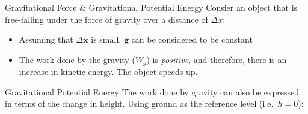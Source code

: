 \documentclass[12pt,compress,aspectratio=169]{beamer}
\begin{document}
\begin{frame}{Gravitational Force \& Gravitational Potential Energy}
  Consier an object that is free-falling under the force of gravity over a
  distance of $\Delta x$:

  \begin{center}
  \end{center}
  \begin{itemize}
  \item Assuming that $\Delta\bm x$ is small, $\bm g$ can be considered to be
    constant
  \item The work done by the gravity ($W_g$) is \emph{positive}, and
    therefore, there is an increase in kinetic energy. The object speeds up.

  \end{itemize}
\end{frame}



\begin{frame}{Gravitational Potential Energy}
  The work done by gravity can also be expressed in terms of the change in
  height. Using ground as the reference level (i.e.\ $h=0$):
  \begin{center}
  \end{center} 
%  
%  

  \vspace{-.3in}{\Large
    \begin{align*}
      W_g
      &= mg(h_2-h_1)\\
      &= -mg(h_2-h_1)=-(mgh_2-mgh_1)
    \end{align*}
  }


\end{frame}
\end{document}
